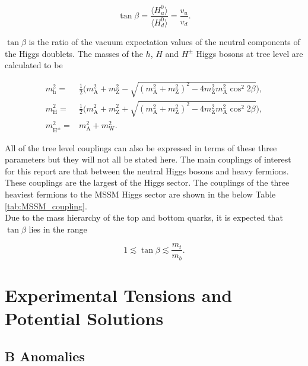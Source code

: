 \begin{equation}
    \tan \beta = \frac{\langle H_{u}^{0} \rangle}{\langle H_{d}^{0} \rangle} = \frac{v_u}{v_d}.
\end{equation}

\(\tan \beta\) is the ratio of the vacuum expectation values of the neutral components of the Higgs doublets. The masses of the \(h\), \(H\) and \(H^{\pm}\) Higgs bosons at tree level are calculated to be \cite{mssm_theory}

\begin{subequations}
\begin{align}
    m_{\text{h}}^2 = & \frac{1}{2}\Big(m_{\text{A}}^2 + m_{\text{Z}}^2 - \sqrt{(m_{\text{A}}^2 + m_{\text{Z}}^2)^2 - 4 m_{\text{Z}}^2 m_{\text{A}}^2 \cos^2{2\beta}} \Big), \\
    m_{\text{H}}^2 = & \frac{1}{2}\Big(m_{\text{A}}^2 + m_{\text{Z}}^2 + \sqrt{(m_{\text{A}}^2 + m_{\text{Z}}^2)^2 - 4 m_{\text{Z}}^2 m_{\text{A}}^2 \cos^2{2\beta}} \Big), \\
    m_{\text{H}^{\pm}}^2 = & m_{\text{A}}^2 + m_{\text{W}}^2.
\end{align}
\end{subequations}

All of the tree level couplings can also be expressed in terms of these three parameters but they will not all be stated here. The main couplings of interest for this report are that between the neutral Higgs bosons and heavy fermions. These couplings are the largest of the Higgs sector. The couplings of the three heaviest fermions to the MSSM Higgs sector are shown in the below Table \ref{tab:MSSM_coupling}. \\

Due to the mass hierarchy of the top and bottom quarks, it is expected that \(\tan\beta\) lies in the range

\begin{equation}
    1 \lesssim \tan\beta \lesssim \frac{m_t}{m_b}.
\end{equation}


\section{Experimental Tensions and Potential Solutions}

\subsection{B Anomalies}

